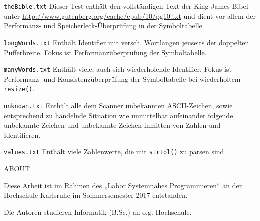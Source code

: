 \documentclass[
a4paper,   %
11pt,      %
oneside,   %
onecolumn, %
final      %
]{article}
\newcommand{\code}[1]{\lstinline$#1$}
\begin{document}
\begin{description}
\item{\texttt{theBible.txt}} Dieser Test enthält den vollständigen Text der King-James-Bibel unter \url{http://www.gutenberg.org/cache/epub/10/pg10.txt} und dient vor allem der Performanz- und Speicherleck-Überprüfung in der Symboltabelle.

\item{\texttt{longWords.txt}} Enthält Identifier mit versch. Wortlängen jenseits der doppelten Pufferbreite. Fokus ist Performanzüberprüfung der Symboltabelle.

\item{\texttt{manyWords.txt}} Enthält viele, auch sich wiederholende Identifier. Fokus ist Performanz- und Konsistenzüberprüfung der Symboltabelle bei wiederholtem \code{resize()}.

\item{\texttt{unknown.txt}} Enthält alle dem Scanner unbekannten ASCII-Zeichen, sowie entsprechend zu händelnde Situation wie unmittelbar aufeinander folgende unbekannte Zeichen und unbekannte Zeichen inmitten von Zahlen und Identifieren.

\item{\texttt{values.txt}} Enthält viele Zahlenwerte, die mit \code{strtol()} zu parsen sind.

\end{description}








\appendix


\begin{description}
\vspace{2cm}
\item{ABOUT}
    \begin{description}
    \item{Diese Arbeit} ist im Rahmen des „Labor Systemnahes Programmieren“ an der Hochschule Karlsruhe im Sommersemester 2017 entstanden.

    \item{Die Autoren} studieren Informatik (B.Sc.) an o.g. Hochschule.
\end{description}
\end{description}


%
%
\end{document}
